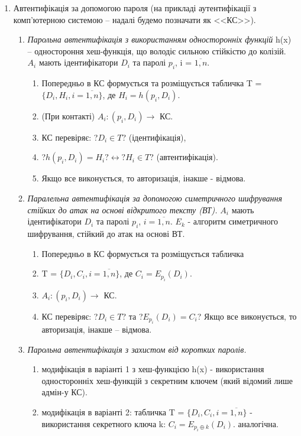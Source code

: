 \begin{enumerate}
\item Автентифікація за допомогою пароля  (на прикладі аутентифікації з комп'ютерною системою -- надалі будемо позначати як <<КС>>).
 \begin{enumerate}
    \item \textit{Парольна автентифікація з використанням односторонніх функцій}
     h(x) -- одностороння хеш-функція, що володіє сильною стійкістю до колізій.
     $A_{i}$ мають ідентифікатори $D_{i}$ та паролі $p_{i}$, i = $\overline{1,n}$.

\begin{enumerate}       
        \item Попередньо в КС формується та розміщується табличка \newline T = $\{D_{i}, H_{i}, i = \overline{1,n}\}$, де $H_{i} = h(p_{i},D_{i})$.
        \item (При контакті) $A_{i}: (p_{i},D_{i}) \rightarrow $ КС.
        \item КС перевіряє: ?$D_{i} \in T$? (ідентифікація),
        \item ?$h(p_{i}, D_{i}) = H_{i}? \longleftrightarrow ?H_{i} \in T$? (автентифікація).
        \item Якщо все виконується, то авторизація, інакше - відмова.  
\end{enumerate}
   
    \item \textit{Паралельна автентифікація за допомогою симетричного шифрування стійких до атак на основі відкритого тексту (ВТ).}
      $A_{i}$ мають ідентифікатори $D_{i}$ та паролі $p_{i}$, $i = \overline{1,n}$.
      $E_{k}$ - алгоритм симетричного шифрування, стійкий до атак на основі ВТ.
     
\begin{enumerate}
     \item Попередньо в КС формується та розміщується табличка 
     \item T = $\{D_{i}, C_{i}, i = \overline{1,n}\}$, де $C_{i} = E_{p_{i}}(D_{i})$.
     \item $A_{i}: (p_{i},D_{i}) \rightarrow $ КС.
     \item КС перевіряє: ?$D_{i} \in T$? та ?$E_{p_{i}}(D_{i}) = C_{i}$?
     \newline Якщо все виконується, то авторизація, інакше -- відмова.
\end{enumerate}

    \item \textit{Парольна автентифікація з захистом від коротких паролів.}
\begin{enumerate}
     \item модифікація в варіанті 1 з хеш-функцією h(x) - використання односторонніх хеш-функцій з секретним ключем (який відомий лише адмін-у КС).
     \item модифікація в варіанті 2: табличка T = $\{D_{i}, C_{i}, i = \overline{1,n}\}$ - використання секретного ключа k: $C_{i} = E_{p_{i}\oplus k}(D_{i})$.
      аналогічна.
\end{enumerate}    
    

\end{enumerate}
\end{enumerate}
